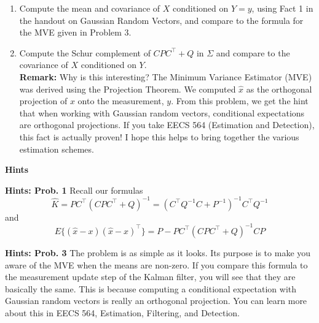 \documentclass[letterpaper]{article}
\begin{document}
\begin{enumerate}
\begin{enumerate}
\item  Compute the mean and covariance of $X$ conditioned on $Y=y$, using Fact 1 in the handout on Gaussian Random Vectors, and compare to the formula for the MVE given in Problem 3.

\item Compute the Schur complement of $ CPC^\top + Q$ in $\Sigma$ and compare to the covariance of $X$ conditioned on $Y$.\\

\noindent \textbf{Remark:} Why is this interesting? The Minimum Variance Estimator (MVE) was derived using the Projection Theorem. We computed $\widehat{x}$ as the orthogonal projection of $x$ onto the measurement, $y$. From this problem, we get the hint that when working with Gaussian random vectors, conditional expectations are orthogonal projections. If you take EECS 564 (Estimation and Detection), this fact is actually proven! I hope this helps to bring together the various estimation schemes.

\end{enumerate}

\end{enumerate}

\newpage

\begin{center}
{\bf Hints}
\end{center}

\noindent \textbf{Hints: Prob. 1 } Recall our formulas
$$ \widehat{K}=P C^\top(C PC^\top +Q)^{-1}  = (C^\top Q^{-1}C + P^{-1})^{-1} C^\top Q^{-1} $$
and
$$E\{ (\hat{x}-x)(\hat{x}-x)^\top \}=P - PC^\top(CPC^\top + Q)^{-1}CP$$

\vspace{1cm}
\noindent \textbf{Hints: Prob. 3} The problem is as simple as it looks. Its purpose is to make you aware of the MVE when the means are non-zero. If you compare this formula to the measurement update step of the Kalman filter, you will see that they are basically the same. This is because computing a conditional expectation with Gaussian random vectors is really an orthogonal projection. You can learn more about this in EECS 564, Estimation, Filtering, and Detection.

\vspace{1cm}
\end{document}
